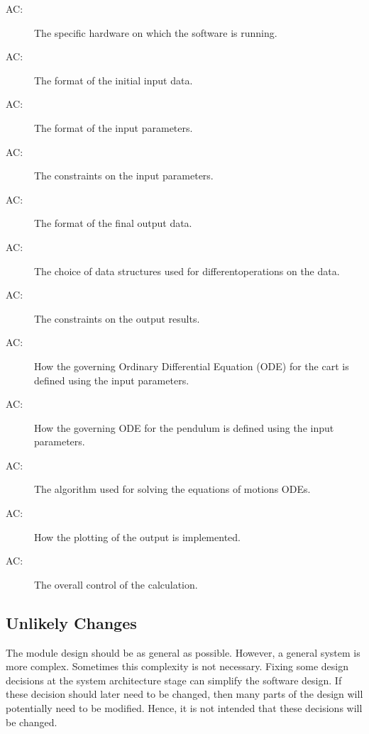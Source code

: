 \documentclass[12pt, titlepage]{article}
\newcounter{acnum}
\newcommand{\actheacnum}{AC\theacnum}
\begin{document}
\begin{description}
\item[ \actheacnum \label{acHardware}:] The specific
  hardware on which the software is running.
\item[ \actheacnum \label{acInput}:] The format of the initial input data.
\item[ \actheacnum \label{acParams}:] The format of the  input parameters.
\item[ \actheacnum \label{acVerify}:] The constraints on
  the input parameters.
\item[ \actheacnum \label{acOutput}:] The format of the  final output data.
\item[ \actheacnum \label{acDS}:] The choice of data structures used for differentoperations on the data.
\item[ \actheacnum \label{acVerifyOut}:] The constraints on the output results.
\item[ \actheacnum \label{acODEsC}:] How the governing Ordinary Differential Equation (ODE) for the cart is defined using the input parameters.
\item[ \actheacnum \label{acODEsP}:] How the governing ODE for the pendulum is defined using the input parameters.
\item[ \actheacnum \label{acSolver}:] The algorithm used for solving the equations of motions ODEs.
\item[ \actheacnum \label{acPlot}:] How the plotting of the output is implemented.
\item[ \actheacnum \label{acControl}:] The overall control of the calculation.
\end{description}

\subsection{Unlikely Changes} \label{SecUchange}

The module design should be as general as possible. However, a general system is
more complex. Sometimes this complexity is not necessary. Fixing some design
decisions at the system architecture stage can simplify the software design. If
these decision should later need to be changed, then many parts of the design
will potentially need to be modified. Hence, it is not intended that these
decisions will be changed.
\end{document}
